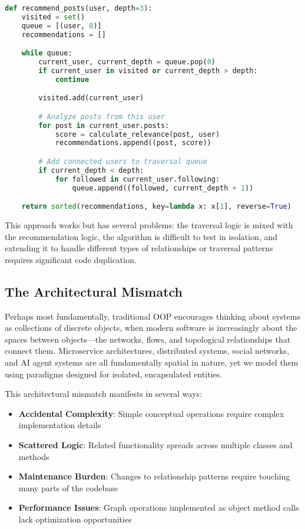 \begin{lstlisting}[language=Python]
def recommend_posts(user, depth=3):
    visited = set()
    queue = [(user, 0)]
    recommendations = []

    while queue:
        current_user, current_depth = queue.pop(0)
        if current_user in visited or current_depth > depth:
            continue

        visited.add(current_user)

        # Analyze posts from this user
        for post in current_user.posts:
            score = calculate_relevance(post, user)
            recommendations.append((post, score))

        # Add connected users to traversal queue
        if current_depth < depth:
            for followed in current_user.following:
                queue.append((followed, current_depth + 1))

    return sorted(recommendations, key=lambda x: x[1], reverse=True)
\end{lstlisting}

This approach works but has several problems: the traversal logic is mixed with the recommendation logic, the algorithm is difficult to test in isolation, and extending it to handle different types of relationships or traversal patterns requires significant code duplication.

\subsection{The Architectural Mismatch}

Perhaps most fundamentally, traditional OOP encourages thinking about systems as collections of discrete objects, when modern software is increasingly about the spaces between objects—the networks, flows, and topological relationships that connect them. Microservice architectures, distributed systems, social networks, and AI agent systems are all fundamentally spatial in nature, yet we model them using paradigms designed for isolated, encapsulated entities.

This architectural mismatch manifests in several ways:
\begin{itemize}
    \item \textbf{Accidental Complexity}: Simple conceptual operations require complex implementation details
    \item \textbf{Scattered Logic}: Related functionality spreads across multiple classes and methods
    \item \textbf{Maintenance Burden}: Changes to relationship patterns require touching many parts of the codebase
    \item \textbf{Performance Issues}: Graph operations implemented as object method calls lack optimization opportunities
\end{itemize}

